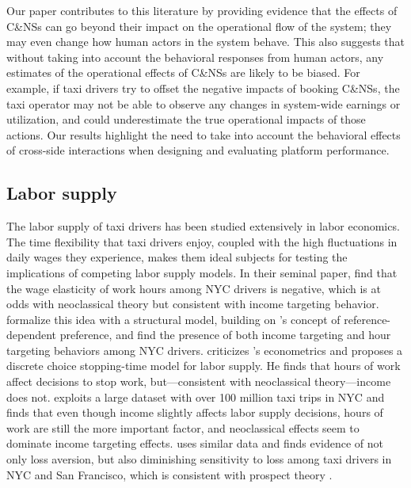 \documentclass[reviewmode]{restud}
\begin{document}
Our paper contributes to this literature by providing evidence that the effects of C\&NSs can go beyond their impact on the operational flow of the system; they may even change how human actors in the system behave. This also suggests that without taking into account the behavioral responses from human actors, any estimates of the operational effects of C\&NSs are likely to be biased. For example, if taxi drivers try to offset the negative impacts of booking C\&NSs, the taxi operator may not be able to observe any changes in system-wide earnings or utilization, and could underestimate the true operational impacts of those actions. Our results highlight the need to take into account the behavioral effects of cross-side interactions when designing and evaluating platform performance.


\subsection{Labor supply}
The labor supply of taxi drivers has been studied extensively in labor economics. The time flexibility that taxi drivers enjoy, coupled with the high fluctuations in daily wages they experience, makes them ideal subjects for testing the implications of competing labor supply models. In their seminal paper, \citet{camerer1997labor} find that the wage elasticity of work hours among NYC drivers is negative, which is at odds with neoclassical theory but consistent with income targeting behavior. \citet{crawford2011new} formalize this idea with a structural model, building on \citeauthor{kHoszegi2006model}'s \citeyear{kHoszegi2006model} concept of reference-dependent preference, and find the presence of both income targeting and hour targeting behaviors among NYC drivers. \citet{farber2005tomorrow} criticizes \citeauthor{camerer1997labor}'s econometrics and proposes a discrete choice stopping-time model for labor supply. He finds that hours of work affect decisions to stop work, but---consistent with neoclassical theory---income does not. \citet{farber2015you} exploits a large dataset with over 100 million taxi trips in NYC and finds that even though income slightly affects labor supply decisions, hours of work are still the more important factor, and neoclassical effects seem to dominate income targeting effects. \citet{martin2017quit} uses similar data and finds evidence of not only loss aversion, but also diminishing sensitivity to loss among taxi drivers in NYC and San Francisco, which is consistent with prospect theory \citep{kahneman1979prospect}. 
\end{document}
